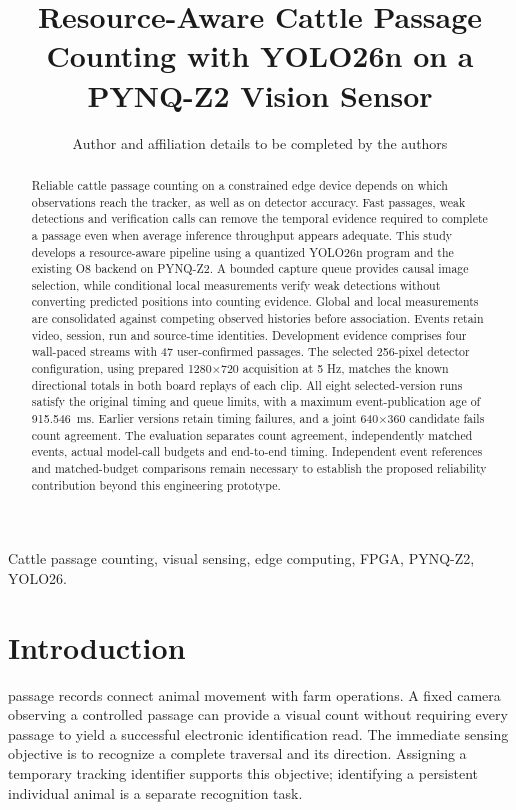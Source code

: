 \documentclass[journal]{IEEEtran}
\title{Resource-Aware Cattle Passage Counting with YOLO26n on a PYNQ-Z2 Vision Sensor}
\author{Author and affiliation details to be completed by the authors}
\begin{document}
\maketitle
\begin{abstract}
Reliable cattle passage counting on a constrained edge device depends on which observations reach the tracker, as well as on detector accuracy. Fast passages, weak detections and verification calls can remove the temporal evidence required to complete a passage even when average inference throughput appears adequate. This study develops a resource-aware pipeline using a quantized YOLO26n program and the existing O8 backend on PYNQ-Z2. A bounded capture queue provides causal image selection, while conditional local measurements verify weak detections without converting predicted positions into counting evidence. Global and local measurements are consolidated against competing observed histories before association. Events retain video, session, run and source-time identities. Development evidence comprises four wall-paced streams with 47 user-confirmed passages. The selected 256-pixel detector configuration, using prepared 1280$\times$720 acquisition at 5 Hz, matches the known directional totals in both board replays of each clip. All eight selected-version runs satisfy the original timing and queue limits, with a maximum event-publication age of 915.546~ms. Earlier versions retain timing failures, and a joint 640$\times$360 candidate fails count agreement. The evaluation separates count agreement, independently matched events, actual model-call budgets and end-to-end timing. Independent event references and matched-budget comparisons remain necessary to establish the proposed reliability contribution beyond this engineering prototype.
\end{abstract}
\begin{IEEEkeywords}
Cattle passage counting, visual sensing, edge computing, FPGA, PYNQ-Z2, YOLO26.
\end{IEEEkeywords}

\section{Introduction}
 passage records connect animal movement with farm operations. A fixed camera observing a controlled passage can provide a visual count without requiring every passage to yield a successful electronic identification read. The immediate sensing objective is to recognize a complete traversal and its direction. Assigning a temporary tracking identifier supports this objective; identifying a persistent individual animal is a separate recognition task.
\end{document}
